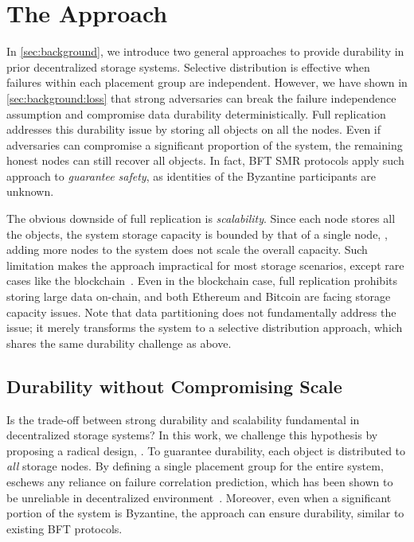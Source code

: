 \section{The \sys Approach}
\label{sec:approach}

In \autoref{sec:background}, we introduce two general approaches to provide durability in prior decentralized storage systems.
Selective distribution is effective when failures within each placement group are independent.
However, we have shown in \autoref{sec:background:loss} that strong adversaries can break the failure independence assumption and compromise data durability deterministically.
Full replication addresses this durability issue by storing all objects on all the nodes.
Even if adversaries can compromise a significant proportion of the system, the remaining honest nodes can still recover all objects.
In fact, BFT SMR protocols apply such approach to \emph{guarantee safety}, as identities of the Byzantine participants are unknown.

The obvious downside of full replication is \emph{scalability}.
Since each node stores all the objects, the system storage capacity is bounded by that of a single node, \ie, adding more nodes to the system does not scale the overall capacity.
Such limitation makes the approach impractical for most storage scenarios, except rare cases like the blockchain~\cite{bitcoin,ethereum}.
Even in the blockchain case, full replication prohibits storing large data on-chain, and both Ethereum and Bitcoin are facing storage capacity issues.
Note that data partitioning does not fundamentally address the issue;
it merely transforms the system to a selective distribution approach, which shares the same durability challenge as above.

\subsection{Durability without Compromising Scale}
\label{sec:approach:insight}

Is the trade-off between strong durability and scalability fundamental in decentralized storage systems?
In this work, we challenge this hypothesis by proposing a radical design, \sys.
To guarantee durability, each object is distributed to \emph{all} storage nodes.
By defining a single placement group for the entire system, \sys eschews any reliance on failure correlation prediction, which has been shown to be unreliable in decentralized environment~\cite{irisstore}.
Moreover, even when a significant portion of the system is Byzantine, the approach can ensure durability, similar to existing BFT protocols.

